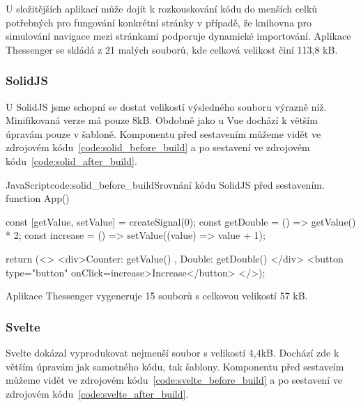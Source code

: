 \documentclass[
  master,
  program=ainf,
  tables=false,
  sourcecodes,
  glossaries,
  index
]{kidiplom}
\begin{document}
U složitějších aplikací může dojít k rozkouskování kódu do menších celků potřebných pro fungování
konkrétní stránky v případě, že knihovna pro simulování navigace mezi stránkami podporuje dynamické importování.
Aplikace Thessenger se skládá z 21 malých souborů, kde celková velikost činí 113,8 kB.

\subsubsection{SolidJS}
U SolidJS \cite{solidjs} jsme schopní se dostat velikostí výsledného souboru výrazně níž. Minifikovaná verze má pouze
8kB. Obdobně jako u Vue \cite{vue} dochází k větším úpravám pouze v šabloně. Komponentu před sestavením můžeme vidět
ve zdrojovém kódu~\ref{code:solid_before_build} a po sestavení ve zdrojovém kódu~\ref{code:solid_after_build}.

  \begin{kicode}{JavaScript}{code:solid_before_build}{Srovnání kódu SolidJS před sestavením.}
    function App() {
      const [getValue, setValue] = createSignal(0);
      const getDouble = () => getValue() * 2;
      const increase = () => setValue((value) => value + 1);
    
      return (<>
        <div>Counter: { getValue() }, Double: { getDouble() }</div>
        <button type="button" onClick={increase}>Increase</button>
      </>);
    }
\end{kicode}


Aplikace Thessenger vygeneruje 15 souborů s celkovou velikostí 57 kB.

\subsubsection{Svelte}
Svelte \cite{svelte} dokázal vyprodukovat nejmenší soubor s velikostí 4,4kB. Dochází zde k větším úpravám
jak samotného kódu, tak šablony. Komponentu před sestaveím můžeme vidět ve zdrojovém kódu~\ref{code:svelte_before_build} a po
sestavení ve zdrojovém kódu~\ref{code:svelte_after_build}. 
\end{document}
